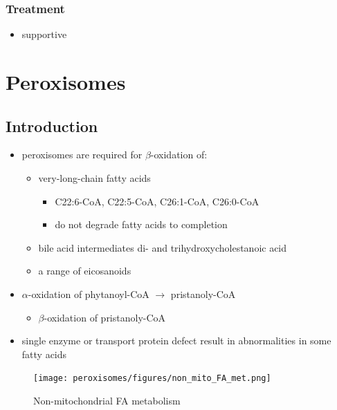 \documentclass[12pt]{scrartcl}
\begin{document}
\subsubsection{Treatment}
\label{sec:orgd4f8c22}
\begin{itemize}
\item supportive
\end{itemize}

\section{Peroxisomes}
\label{sec:org25a5388}
\subsection{Introduction}
\label{sec:orgb60142c}
\begin{itemize}
\item peroxisomes are required for \(\beta\)-oxidation of:
\begin{itemize}
\item very-long-chain fatty acids
\begin{itemize}
\item C22:6-CoA, C22:5-CoA, C26:1-CoA, C26:0-CoA
\item do not degrade fatty acids to completion
\end{itemize}
\item bile acid intermediates di- and trihydroxycholestanoic acid
\item a range of eicosanoids
\end{itemize}
\item \(\alpha\)-oxidation of phytanoyl-CoA \(\to\) pristanoly-CoA
\begin{itemize}
\item \(\beta\)-oxidation of pristanoly-CoA
\end{itemize}
\item single enzyme or transport protein defect result in abnormalities in some fatty acids
\end{itemize}

\begin{figure}[htbp]
\centering
\texttt{[image: peroxisomes/figures/non\_mito\_FA\_met.png]}
\caption[Non-mitochondrial FA metabolism]{\label{fig:org09fc3ea}Non-mitochondrial FA metabolism}
\end{figure}
\end{document}
